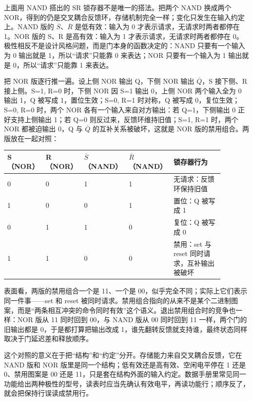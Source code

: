 
上面用 NAND 搭出的 SR 锁存器不是唯一的搭法。把两个 NAND 换成两个 NOR，得到的仍是交叉耦合反馈环，存储机制完全一样；变化只发生在输入约定上。NAND 版的 $\overline{S}$、$\overline{R}$ 是低有效：输入为 0 才表示请求，无请求时两者都停在 1。NOR 版的 S、R 是高有效：输入为 1 才表示请求，无请求时两者都停在 0。极性相反不是设计风格问题，而是门本身的函数决定的：NAND 只要有一个输入为 0 输出就是 1，所以“请求”只能靠 0 来表达；NOR 只要有一个输入为 1 输出就是 0，所以“请求”只能靠 1 来表达。

把 NOR 版逐行推一遍。设上侧 NOR 输出 Q，下侧 NOR 输出 $\overline{Q}$，S 接下侧、R 接上侧。S=1, R=0 时，下侧 NOR 因 S=1 输出 0，上侧 NOR 两个输入全为 0 输出 1，Q 被写成 1，置位生效；S=0, R=1 时对称，Q 被写成 0，复位生效；S=0, R=0 时，两个 NOR 各有一个输入来自对方输出：若 Q=1，下侧输出 0 正好支持上侧输出 1；若 Q=0 则反过来，反馈环维持旧值；S=1, R=1 时，两个 NOR 都被迫输出 0，Q 与 $\overline{Q}$ 的互补关系被破坏，这就是 NOR 版的禁用组合。两版放在一起对照：

\begin{longtable}{L{0.12\linewidth}L{0.12\linewidth}L{0.15\linewidth}L{0.15\linewidth}L{0.34\linewidth}}
\toprule
S（NOR） & R（NOR） & $\overline{S}$（NAND） & $\overline{R}$（NAND） & 锁存器行为 \\
 & 0 & 1 & 1 & 无请求：反馈环保持旧值 \\
1 & 0 & 0 & 1 & 置位：Q 被写成 1 \\
0 & 1 & 1 & 0 & 复位：Q 被写成 0 \\
1 & 1 & 0 & 0 & 禁用：set 与 reset 同时请求，互补输出被破坏 \\
\bottomrule
\end{longtable}

表面看，两版的禁用组合一个是 11、一个是 00，似乎完全不同；实际上它们表示同一件事——set 和 reset 被同时请求。禁用组合指向的从来不是某个二进制图案，而是“两条相互冲突的命令同时有效”这个语义。退出禁用组合时的竞争也一样：NOR 版从 11 同时回到 00，与 NAND 版从 00 同时回到 11 一样，两个门的旧输出都是 0，于是都打算把输出改成 1，谁先翻转反馈就支持谁，最终状态同样取决于门延迟差和释放顺序。

这个对照的意义在于把“结构”和“约定”分开。存储能力来自交叉耦合反馈，它在 NAND 版和 NOR 版里是同一个结构；低有效还是高有效、空闲电平停在 1 还是 0、禁用图案是 00 还是 11，只是套在结构外面的输入约定。数据手册里常见同一功能给出两种极性的型号，读表时应当先确认有效电平，再读功能行；顺序反了，就会把保持行误读成禁用行。

